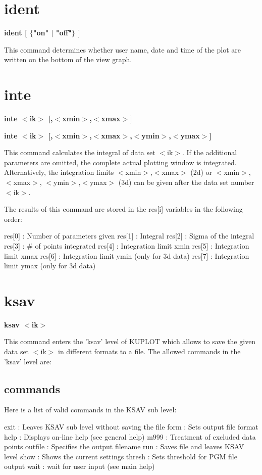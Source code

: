 \section{ident}
{\bf ident [ $ \{$"on" $| $ "off"$\} $ ] \par }
\par
\vspace{3pt}
This command determines whether user name, date and time of the plot 
are written on the bottom of the view graph. 
\section{inte}
{\bf inte $ <$ik$> $ [,$ <$xmin$> $,$ <$xmax$> $] \par }
{\bf inte $ <$ik$> $ [,$ <$xmin$> $,$ <$xmax$> $,$ <$ymin$> $,$ <$ymax$> $] \par }
\par
\vspace{3pt}
This command calculates the integral of data set $ <$ik$> $. If the additional 
parameters are omitted, the complete actual plotting window is integrated. 
Alternatively, the integration limits $ <$xmin$> $,$ <$xmax$> $ (2d) or $ <$xmin$> $,$ <$xmax$> $, 
$ <$ymin$> $,$ <$ymax$> $ (3d) can be given after the data set number $ <$ik$> $. 
\par
The results of this command are stored in the res[i] variables in 
the following order: 
\par
\begin{MacVerbatim}
  res[0]   : Number of parameters given
  res[1]   : Integral
  res[2]   : Sigma of the integral
  res[3]   : # of points integrated
  res[4]   : Integration limit xmin
  res[5]   : Integration limit xmax
  res[6]   : Integration limit ymin (only for 3d data)
  res[7]   : Integration limit ymax (only for 3d data)
\end{MacVerbatim}
\section{ksav}
{\bf ksav $ <$ik$> $ \par }
\par
\vspace{3pt}
This command enters the 'ksav' level of KUPLOT which allows to save 
the given data set $ <$ik$> $ in different formats to a file. The allowed 
commands in the 'ksav' level are: 
\par
\subsection*{commands}
Here is a list of valid commands in the KSAV sub level: 
\par
\begin{MacVerbatim}
exit    : Leaves KSAV sub level without saving the file
form    : Sets output file format
help    : Displays on-line help (see general help)
m999    : Treatment of excluded data points
outfile : Specifies the output filename
run     : Saves file and leaves KSAV level
show    : Shows the current settings
thresh  : Sets threshold for PGM file output
wait    : wait for user input (see main help)
\end{MacVerbatim}
